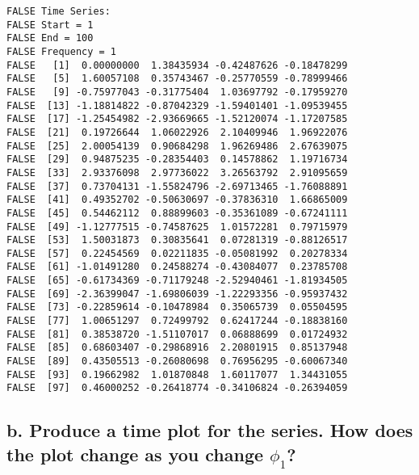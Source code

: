 \documentclass[openany]{book}
\begin{document}
\begin{verbatim}
FALSE Time Series:
FALSE Start = 1 
FALSE End = 100 
FALSE Frequency = 1 
FALSE   [1]  0.00000000  1.38435934 -0.42487626 -0.18478299
FALSE   [5]  1.60057108  0.35743467 -0.25770559 -0.78999466
FALSE   [9] -0.75977043 -0.31775404  1.03697792 -0.17959270
FALSE  [13] -1.18814822 -0.87042329 -1.59401401 -1.09539455
FALSE  [17] -1.25454982 -2.93669665 -1.52120074 -1.17207585
FALSE  [21]  0.19726644  1.06022926  2.10409946  1.96922076
FALSE  [25]  2.00054139  0.90684298  1.96269486  2.67639075
FALSE  [29]  0.94875235 -0.28354403  0.14578862  1.19716734
FALSE  [33]  2.93376098  2.97736022  3.26563792  2.91095659
FALSE  [37]  0.73704131 -1.55824796 -2.69713465 -1.76088891
FALSE  [41]  0.49352702 -0.50630697 -0.37836310  1.66865009
FALSE  [45]  0.54462112  0.88899603 -0.35361089 -0.67241111
FALSE  [49] -1.12777515 -0.74587625  1.01572281  0.79715979
FALSE  [53]  1.50031873  0.30835641  0.07281319 -0.88126517
FALSE  [57]  0.22454569  0.02211835 -0.05081992  0.20278334
FALSE  [61] -1.01491280  0.24588274 -0.43084077  0.23785708
FALSE  [65] -0.61734369 -0.71179248 -2.52940461 -1.81934505
FALSE  [69] -2.36399047 -1.69806039 -1.22293356 -0.95937432
FALSE  [73] -0.22859614 -0.10478984  0.35065739  0.05504595
FALSE  [77]  1.00651297  0.72499792  0.62417244 -0.18838160
FALSE  [81]  0.38538720 -1.51107017  0.06888699  0.01724932
FALSE  [85]  0.68603407 -0.29868916  2.20801915  0.85137948
FALSE  [89]  0.43505513 -0.26080698  0.76956295 -0.60067340
FALSE  [93]  0.19662982  1.01870848  1.60117077  1.34431055
FALSE  [97]  0.46000252 -0.26418774 -0.34106824 -0.26394059
\end{verbatim}

\hypertarget{b.-produce-a-time-plot-for-the-series.-how-does-the-plot-change-as-you-change-phi_1}{%
\subsection{\texorpdfstring{b. Produce a time plot for the series. How does the plot change as you change \(\phi_1\)?}{b. Produce a time plot for the series. How does the plot change as you change \textbackslash{}phi\_1?}}\label{b.-produce-a-time-plot-for-the-series.-how-does-the-plot-change-as-you-change-phi_1}}
\end{document}
